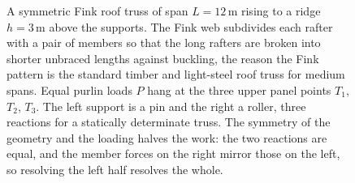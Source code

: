\begin{figure}[htbp]
\caption[Symmetric Fink roof truss]{A symmetric Fink roof truss of span
$L=12\,\si{\meter}$ rising to a ridge $h=3\,\si{\meter}$ above the supports.
The Fink web subdivides each rafter with a pair of members so that the long
rafters are broken into shorter unbraced lengths against buckling, the reason
the Fink pattern is the standard timber and light-steel roof truss for medium
spans. Equal purlin loads $P$ hang at the three upper panel points $T_1$,
$T_2$, $T_3$. The left support is a pin and the right a roller, three
reactions for a statically determinate truss. The symmetry of the geometry
and the loading halves the work: the two reactions are equal, and the
member forces on the right mirror those on the left, so resolving the left
half resolves the whole.}
\label{fig:vol03ch02:fink-truss}
\end{figure}
